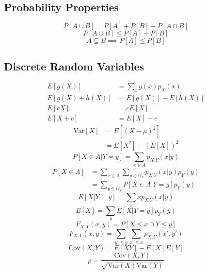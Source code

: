 \documentclass[nobib]{tufte-handout}
\begin{document}
\subsection{Probability Properties}
\begin{equation}
    P\left[A \cup B\right] = P\left[A\right] + P\left[B\right] - P\left[A \cap B\right]
\end{equation}
\begin{equation}
    P\left[A \cup B\right] \leq P\left[A\right] + P\left[B\right]
\end{equation}
\begin{equation}
    A \subseteq B \implies P\left[A\right] \leq P\left[B\right]
\end{equation}

\subsection{Discrete Random Variables}
\begin{align}
    E[g(X)]        & = \sum_{x} g(x)p_X(x) \\
    E[g(X) + h(X)] & = E[g(X)] + E[h(X)]   \\
    E[cX]          & = cE[X]               \\
    E[X + c]       & = E[X] + c
\end{align}
\begin{align}
    \text{Var}[X] & = E\left[(X-\mu)^2\right] \\
                  & = E[X^2] - (E[X])^2
\end{align}
\begin{equation}
    P[X\in A | Y = y] = \sum_{x\in A} p_{X|Y}(x|y)
\end{equation}
\begin{align}
    P[X \in A] & = \sum_{x \in A} \sum_{y \in \Omega_Y} p_{X|Y}(x|y)p_Y(y) \\
               & = \sum_{y\in \Omega_Y} P[X\in A|Y = y]p_Y(y)
\end{align}
\begin{equation}
    E[X|Y=y] = \sum_{x} xp_{X|Y}(x|y)
\end{equation}
\begin{equation}
    E[X] = \sum_{y}E[X|Y=y]p_Y(y)
\end{equation}
\begin{equation}
    F_{X,Y}(x,y) = P\left[X \leq x \cap Y \leq y\right]
\end{equation}
\begin{equation}
    F_{X,Y}(x,y) = \sum_{y'\leq y}\sum_{x' \leq x} p_{X,Y}(x',y')
\end{equation}
\begin{equation}
    \text{Cov}(X, Y) = E[XY] - E[X]E[Y]
\end{equation}
\begin{equation}
    \rho = \frac{\text{Cov}(X, Y)}{\sqrt{\text{Var}(X)\text{Var}(Y)}}
\end{equation}
\end{document}
